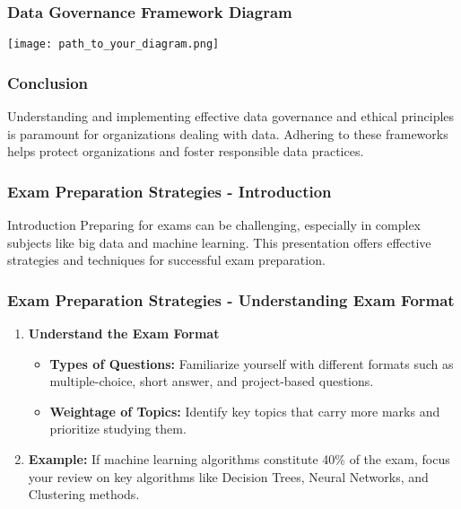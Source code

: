 \documentclass[aspectratio=169]{beamer}
\begin{document}
\begin{frame}[fragile]
    \frametitle{Data Governance Framework Diagram}
    \begin{center}
        \texttt{[image: path\_to\_your\_diagram.png]} %
    \end{center}
\end{frame}

\begin{frame}[fragile]
    \frametitle{Conclusion}
    Understanding and implementing effective data governance and ethical principles is paramount for organizations dealing with data. Adhering to these frameworks helps protect organizations and foster responsible data practices.
\end{frame}

\begin{frame}[fragile]
    \frametitle{Exam Preparation Strategies - Introduction}
    \begin{block}{Introduction}
        Preparing for exams can be challenging, especially in complex subjects like big data and machine learning. This presentation offers effective strategies and techniques for successful exam preparation.
    \end{block}
\end{frame}

\begin{frame}[fragile]
    \frametitle{Exam Preparation Strategies - Understanding Exam Format}
    \begin{enumerate}
        \item \textbf{Understand the Exam Format}
        \begin{itemize}
            \item \textbf{Types of Questions:} Familiarize yourself with different formats such as multiple-choice, short answer, and project-based questions.
            \item \textbf{Weightage of Topics:} Identify key topics that carry more marks and prioritize studying them.
        \end{itemize}
        \item \textbf{Example:} If machine learning algorithms constitute 40\% of the exam, focus your review on key algorithms like Decision Trees, Neural Networks, and Clustering methods.
    \end{enumerate}
\end{frame}
\end{document}
